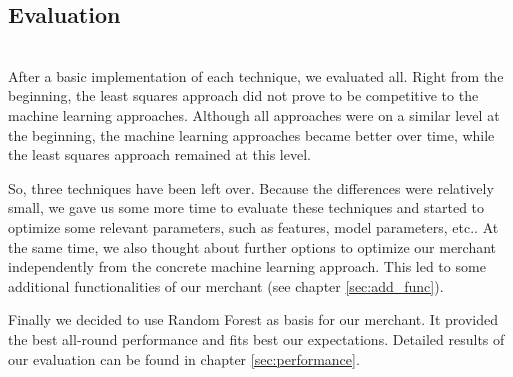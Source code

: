 \subsection{Evaluation}
\label{sec:model_eval}
	~\\
	After a basic implementation of each technique, we evaluated all. Right from the beginning, the least squares approach did not prove to be competitive to the machine learning approaches. Although all approaches were on a similar level at the beginning, the machine learning approaches became better over time, while the least squares approach remained at this level.

	So, three techniques have been left over. Because the differences were relatively small, we gave us some more time to evaluate these techniques and started to optimize some relevant parameters, such as features, model parameters, etc.. At the same time, we also thought about further options to optimize our merchant independently from the concrete machine learning approach. This led to some additional functionalities of our merchant (see chapter \ref{sec:add_func}).

    Finally we decided to use Random Forest as basis for our merchant. It provided the best all-round performance and fits best our expectations. Detailed results of our evaluation can be found in chapter \ref{sec:performance}.






